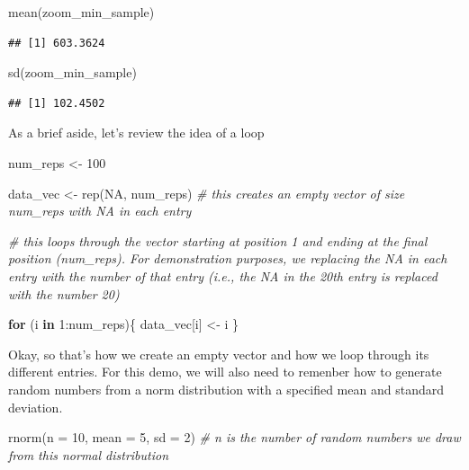 \documentclass[
]{book}
\newenvironment{Shaded}{\begin{snugshade}}{\end{snugshade}}
\newcommand{\AttributeTok}[1]{\textcolor[rgb]{0.77,0.63,0.00}{#1}}
\newcommand{\CommentTok}[1]{\textcolor[rgb]{0.56,0.35,0.01}{\textit{#1}}}
\newcommand{\ConstantTok}[1]{\textcolor[rgb]{0.00,0.00,0.00}{#1}}
\newcommand{\ControlFlowTok}[1]{\textcolor[rgb]{0.13,0.29,0.53}{\textbf{#1}}}
\newcommand{\DecValTok}[1]{\textcolor[rgb]{0.00,0.00,0.81}{#1}}
\newcommand{\FunctionTok}[1]{\textcolor[rgb]{0.00,0.00,0.00}{#1}}
\newcommand{\NormalTok}[1]{#1}
\newcommand{\OtherTok}[1]{\textcolor[rgb]{0.56,0.35,0.01}{#1}}
\newcommand{\SpecialCharTok}[1]{\textcolor[rgb]{0.00,0.00,0.00}{#1}}
\begin{document}
\begin{Shaded}
\begin{Highlighting}[]
\FunctionTok{mean}\NormalTok{(zoom\_min\_sample)}
\end{Highlighting}
\end{Shaded}

\begin{verbatim}
## [1] 603.3624
\end{verbatim}

\begin{Shaded}
\begin{Highlighting}[]
\FunctionTok{sd}\NormalTok{(zoom\_min\_sample)}
\end{Highlighting}
\end{Shaded}

\begin{verbatim}
## [1] 102.4502
\end{verbatim}

As a brief aside, let's review the idea of a loop

\begin{Shaded}
\begin{Highlighting}[]
\NormalTok{num\_reps }\OtherTok{\textless{}{-}} \DecValTok{100}

\NormalTok{data\_vec }\OtherTok{\textless{}{-}} \FunctionTok{rep}\NormalTok{(}\ConstantTok{NA}\NormalTok{, num\_reps) }\CommentTok{\# this creates an empty vector of size num\_reps with NA in each entry}

\CommentTok{\# this loops through the vector starting at position 1 and ending at the final position (num\_reps). For demonstration purposes, we replacing the NA in each entry with the number of that entry (i.e., the NA in the 20th entry is replaced with the number 20)}

\ControlFlowTok{for}\NormalTok{ (i }\ControlFlowTok{in} \DecValTok{1}\SpecialCharTok{:}\NormalTok{num\_reps)\{}
\NormalTok{  data\_vec[i] }\OtherTok{\textless{}{-}}\NormalTok{ i}
\NormalTok{\}}
\end{Highlighting}
\end{Shaded}

Okay, so that's how we create an empty vector and how we loop through its different entries. For this demo, we will also need to remenber how to generate random numbers from a norm distribution with a specified mean and standard deviation.

\begin{Shaded}
\begin{Highlighting}[]
\FunctionTok{rnorm}\NormalTok{(}\AttributeTok{n =} \DecValTok{10}\NormalTok{, }\AttributeTok{mean =} \DecValTok{5}\NormalTok{, }\AttributeTok{sd =} \DecValTok{2}\NormalTok{) }\CommentTok{\# n is the number of random numbers we draw from this normal distribution}
\end{Highlighting}
\end{Shaded}
\end{document}
